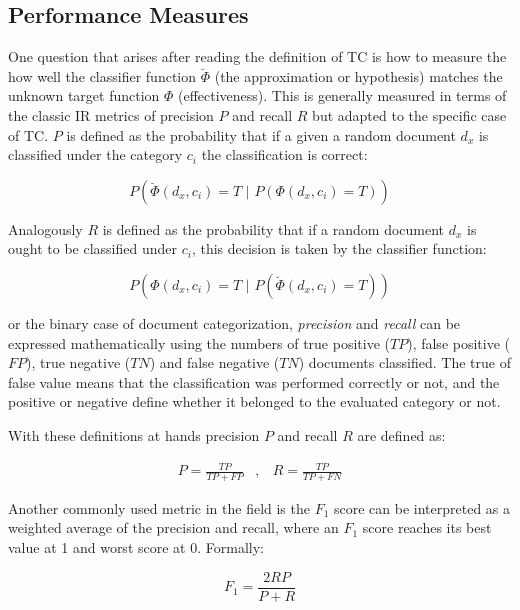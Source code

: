 \subsection{Performance Measures}
\label{sec:sub_performance_measures}

One question that arises after reading the definition of \ac{TC} is how to measure
 the how well the classifier function  $\breve{\Phi}$ (the approximation or hypothesis) matches the unknown target function  $\Phi$
 (effectiveness).  This is generally measured in terms of the classic IR
 metrics of precision  $P$  and recall  $R$ but adapted to the specific case
 of \ac{TC}. $P$  is defined as the probability that if a given a random document
 $d_{x}$  is classified under the category  $c_{i}$  the classification is
 correct:

 \begin{equation*}
P(\breve{\Phi}(d_{x},c_{i})=T\,\,|\,\, P(\Phi(d_{x},c_{i})=T))
\end{equation*}



 Analogously  $R$  is defined as the probability that if a random document 
 $d_{x}$ is ought to be classified under  $c_{i}$,  this decision is taken
 by the classifier function: 

 \begin{equation*}
 P(\Phi(d_{x},c_{i})=T\,\,|\,\, P(\breve{\Phi}(d_{x},c_{i})=T))
\end{equation*}

or the binary case of document categorization, \textit{precision}  and \textit{recall}
can be expressed mathematically using the numbers of true positive ($TP$), false positive
($FP$), true negative ($TN$) and false negative ($TN$) documents
classified. The true of false value means that the classification
was performed correctly or not, and the positive or negative define
whether it belonged to the evaluated category or not. 

With these definitions  at hands precision $P$ and recall $R$ are defined as:


\begin{eqnarray}
P=\frac{TP}{TP+FP} & ,\, & R=\frac{TP}{TP+FN}\end{eqnarray}

Another commonly used metric in the field is the  $F_1$ score can be
interpreted as a weighted average of the precision and recall, where an $F_1$
score reaches its best value at 1 and worst score at 0. Formally:

\begin{equation}
  F_1=\frac{2RP}{P+R}
\end{equation}

